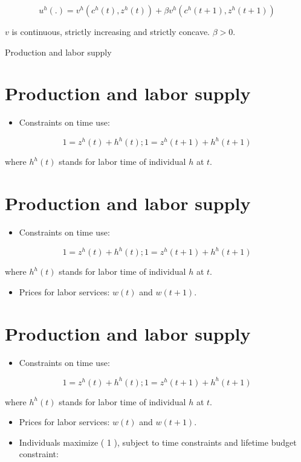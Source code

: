 \documentclass[10pt]{article}
\begin{document}
\begin{equation*}
u^{h}(.)=v^{h}\left(c^{h}(t), z^{h}(t)\right)+\beta v^{h}\left(c^{h}(t+1), z^{h}(t+1)\right) \tag{1}
\end{equation*}


$v$ is continuous, strictly increasing and strictly concave. $\beta>0$.

Production and labor supply

\section*{Production and labor supply}
\begin{itemize}
  \item Constraints on time use:
\end{itemize}

$$
1=z^{h}(t)+h^{h}(t) ; 1=z^{h}(t+1)+h^{h}(t+1)
$$

where $h^{h}(t)$ stands for labor time of individual $h$ at $t$.

\section*{Production and labor supply}
\begin{itemize}
  \item Constraints on time use:
\end{itemize}

$$
1=z^{h}(t)+h^{h}(t) ; 1=z^{h}(t+1)+h^{h}(t+1)
$$

where $h^{h}(t)$ stands for labor time of individual $h$ at $t$.

\begin{itemize}
  \item Prices for labor services: $w(t)$ and $w(t+1)$.
\end{itemize}

\section*{Production and labor supply}
\begin{itemize}
  \item Constraints on time use:
\end{itemize}

$$
1=z^{h}(t)+h^{h}(t) ; 1=z^{h}(t+1)+h^{h}(t+1)
$$

where $h^{h}(t)$ stands for labor time of individual $h$ at $t$.

\begin{itemize}
  \item Prices for labor services: $w(t)$ and $w(t+1)$.
  \item Individuals maximize ( 1 ), subject to time constraints and lifetime budget constraint:
\end{itemize}
\end{document}
